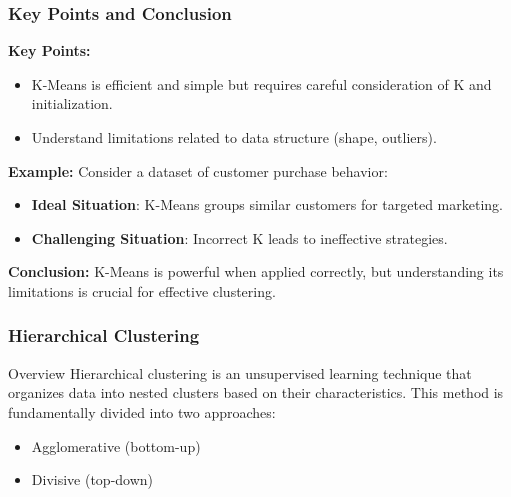 \documentclass{beamer}
\begin{document}
\begin{frame}[fragile]
    \frametitle{Key Points and Conclusion}
    \textbf{Key Points:}
    \begin{itemize}
        \item K-Means is efficient and simple but requires careful consideration of K and initialization.
        \item Understand limitations related to data structure (shape, outliers).
    \end{itemize}

    \textbf{Example:}
    Consider a dataset of customer purchase behavior:
    \begin{itemize}
        \item \textbf{Ideal Situation}: K-Means groups similar customers for targeted marketing.
        \item \textbf{Challenging Situation}: Incorrect K leads to ineffective strategies.
    \end{itemize}

    \textbf{Conclusion:} K-Means is powerful when applied correctly, but understanding its limitations is crucial for effective clustering.
\end{frame}

\begin{frame}[fragile]
    \frametitle{Hierarchical Clustering}
    \begin{block}{Overview}
        Hierarchical clustering is an unsupervised learning technique that organizes data into nested clusters based on their characteristics. 
        This method is fundamentally divided into two approaches: 
        \begin{itemize}
            \item Agglomerative (bottom-up)
            \item Divisive (top-down)
        \end{itemize}
    \end{block}
\end{frame}
\end{document}
